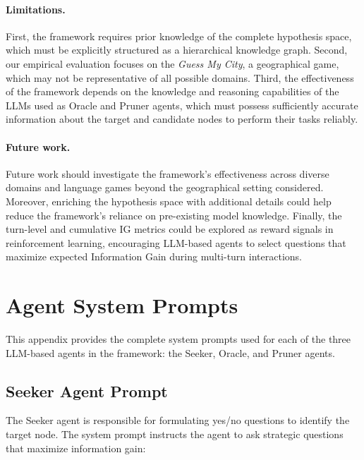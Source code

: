 \documentclass[letterpaper]{article} %
\begin{document}
\paragraph{Limitations.}

First, the framework requires prior knowledge of the complete hypothesis space, which must be explicitly structured as a hierarchical knowledge graph. 
Second, our empirical evaluation focuses on the \emph{Guess My City}, a geographical game, which may not be representative of all possible domains. 
Third, the effectiveness of the framework depends on the knowledge and reasoning capabilities of the LLMs used as Oracle and Pruner agents, which must possess sufficiently accurate information about the target and candidate nodes to perform their tasks reliably.

\paragraph{Future work.}
Future work should investigate the framework's effectiveness across diverse domains and language games beyond the geographical setting considered. Moreover, enriching the hypothesis space with additional details could help reduce the framework's reliance on pre-existing model knowledge. Finally, the turn-level and cumulative IG metrics could be explored as reward signals in reinforcement learning, encouraging LLM-based agents to select questions that maximize expected Information Gain during multi-turn interactions.




\onecolumn
\appendix

\section{Agent System Prompts}\label{apx:seeker_prompt}

This appendix provides the complete system prompts used for each of the three LLM-based agents in the framework: the Seeker, Oracle, and Pruner agents.

\subsection{Seeker Agent Prompt}

The Seeker agent is responsible for formulating yes/no questions to identify the target node. The system prompt instructs the agent to ask strategic questions that maximize information gain:
\end{document}

